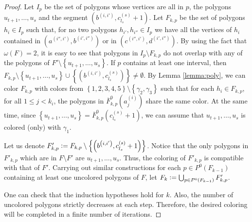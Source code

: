\documentclass[12pt]{article}
\theoremstyle{definition}
\newcommand{\defeq}{\vcentcolon=}
\begin{document}
\begin{proof}
         Let $I_{p}$ be the set of polygons
         whose vertices are all
         in $p$, the polygons
         $u_{t+1}, \ldots, u_{s}$ and 
         the segment $\left(b^{\left(i, i'\right)},
         c_{l_{s}}^{\left(s\right)} + 1\right)$.
         Let $F_{k, p}$ be the set of
         polygons $h_{i} \in I_{p}$ 
         such that, for no two polygons
         $h_{i'}, h_{i''} \in I_{p}$
         we have all the vertices
         of $h_{i}$ contained in
         $\left(a^{\left(i'', i'\right)},
         b^{\left(i', i''\right)}\right)$ 
         or in
         $\left(c^{\left(i'',i'\right)}, 
         d^{\left(i',i''\right)}\right)$.
         By using the fact
         that $\omega\left(F\right) = 2$,
         it is easy to see that 
         polygons in $I_{p} \setminus F_{k, p}$ 
         do not overlap with 
         any of the polygons of
         $F' \setminus \left\{u_{t+1}, \ldots
         , u_{s}\right\}$.
         If $p$ contains at least
         one interval, 
         then 
         $F_{k, p} \setminus 
         \left\{u_{t + 1}, \ldots,
         u_{s}\right\} \cup 
         \left\{ \left(b^{\left(i, i'\right)}, 
         c_{l_{s}}^{\left(s\right)}\right)\right\}
         \neq \emptyset$.
         By Lemma \ref{lemma:poly},
         we can color $F_{k, p}$ with
         colors from 
         $\left\{1, 2, 3, 4, 5\right\} \setminus 
         \left\{\gamma_2, \gamma_3\right\}$
         such that for each $h_{i} \in F_{k, p}$,
         for all
         $1 \leq j < k_{i}$, the polygons in
         $\overline{F}_{k, p}^{0}\left(a_{j}^{\left(i\right)}\right)$ 
         share the same color. At the same time,
         since $\left\{u_{t +1}, \ldots, u_{s}\right\} = 
         \overline{F}_{k, p}^{0}\left(c_{l_{s}}^{\left(s\right)} + 1\right)$,
         we can assume that $u_{t + 1}, \ldots, u_{s}$ 
         is colored (only) with $\gamma_1$.

         Let us denote $F'_{k, p} \defeq
         F_{k, p} \setminus \left\{\left(
         b^{\left(i, i'\right)},
         c_{l_{s}}^{\left(s\right)} + 1\right)\right\}$.
         Notice that the only
         polygons in $F'_{k, p}$ 
         which are in $F \setminus F'$ 
         are $u_{t + 1}, \ldots, u_{s}$.
         Thus, the coloring of
         $F'_{k, p}$ is compatible with that 
         of $F'$. Carrying out similar 
         constructions for each 
         $p \in P^{0}\left(F_{k-1}\right)$ 
         containing at least one uncolored
         polygons of $F$, let 
         $F_{k} \defeq \bigcup_{p \in P^{0}\left(F_{k -1}\right)}
         F'_{k, p}$.

         One can check that the induction
         hypotheses hold for $k$.
         Also, the number of uncolored polygons
         strictly decreases at each step.
         Therefore, the desired coloring will be completed
         in a finite number of iterations.
     \end{proof}    
     
     \printbibliography
\end{document}
